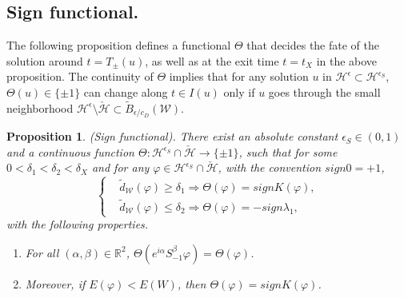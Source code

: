 \documentclass[reqno, 11pt]{amsart}
\numberwithin{equation}{section}
\newcommand{\R}{\mathbb{R}}
\theoremstyle{plain}
\newtheorem{proposition}[theorem]{Proposition}
\theoremstyle{definition}
\numberwithin{equation}{section}
\numberwithin{theorem}{section}
\numberwithin{equation}{section}
\numberwithin{equation}{section}
\numberwithin{theorem}{section}
\begin{document}
	\subsection{Sign functional.}The following proposition defines a functional $\Theta$ that decides the fate of the solution around $t= T_{\pm}(u)$, as well as at the exit time $t=t_X$ in the above proposition. The continuity of $\Theta$ implies that for any solution $u$ in $\mathcal{H}^{\epsilon}\subset \mathcal{H}^{\epsilon_{S}}$, $\Theta(u)\in\{\pm1 \}$ can change along $t\in I(u)$ only if $u$ goes through the small neighborhood $\mathcal{H}^{\epsilon}\setminus \check{\mathcal{H}} \subset \widetilde{B}_{\epsilon/{c_D}}(\mathcal{W})$. 
	\begin{proposition}(Sign functional)\label{prop:sign funct}. There exist an absolute constant $\epsilon_S \in(0,1)$ and a continuous function $\Theta:\mathcal{H}^{\epsilon_S} \cap \check{\mathcal{H}} \rightarrow \{\pm1 \}$, such that for some $0<\delta_1<\delta_2<\delta_X$ and for any $\varphi \in \mathcal{H}^{\epsilon_S} \cap \check{\mathcal{H}} $, with the convention $sign 0=+1$,
		\begin{equation}\label{quan:sign func}
		\left\{\begin{aligned}
		&\widetilde{d}_{\mathcal{W}}(\varphi)\geq \delta_1 \Longrightarrow \Theta(\varphi)=signK(\varphi) ,\\
		&\widetilde{d}_{\mathcal{W}}(\varphi)\leq \delta_2 \Longrightarrow \Theta(\varphi)=-sign \lambda_{1} ,
		\end{aligned}\right.
		\end{equation}	
		with the following properties.
		\begin{enumerate}
			\item[$(1)$] For all $(\alpha,\beta)\in \R^2$, $\Theta(e^{i\alpha}S_{-1}^{\beta}\varphi)=\Theta(\varphi)$. 
			\item[$(2)$] Moreover, if $E(\varphi)<E(W)$, then $\Theta(\varphi)=signK(\varphi)$.
		\end{enumerate}
	\end{proposition}
\end{document}
